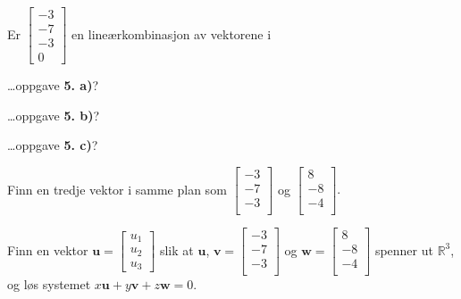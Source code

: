 \begin{oppgave}
	Er 
	$
	\begin{bmatrix}
	-3  \\
	-7 \\
	-3 \\
	0
	\end{bmatrix}
	$
	en lineærkombinasjon av vektorene i 
	
\begin{punkt}
\ldots oppgave \textbf{5. a)}?
\end{punkt} 
\begin{punkt}
	\ldots oppgave \textbf{5. b)}?
\end{punkt} 
\begin{punkt}
	\ldots oppgave \textbf{5. c)}?
\end{punkt} 
\end{oppgave}



\begin{oppgave}
	Finn en tredje vektor i samme plan som
	$
	\begin{bmatrix}
	-3  \\
	-7 \\
	-3 \\
	\end{bmatrix}
	$
	og 
	$
	\begin{bmatrix}
	8  \\
	-8 \\
	-4 \\
	\end{bmatrix}.
	$
\end{oppgave}




\begin{oppgave}
	Finn en vektor 
	$\mathbf{u}=\begin{bmatrix}
	u_1    \\
	u_2 \\
	u_3  
	\end{bmatrix}
	$ slik at $\mathbf{u}$, 
	$
	\mathbf{v}=
	\begin{bmatrix}
	-3  \\
	-7 \\
	-3 \\
	\end{bmatrix}
	$
	og 
	$
	\mathbf{w}=
	\begin{bmatrix}
	8  \\
	-8 \\
	-4 \\
	\end{bmatrix}
	$
	spenner ut $\mathbb{R}^3$, og løs systemet $x\mathbf{u}+y\mathbf{v}+z\mathbf{w}=0$.
\end{oppgave}





